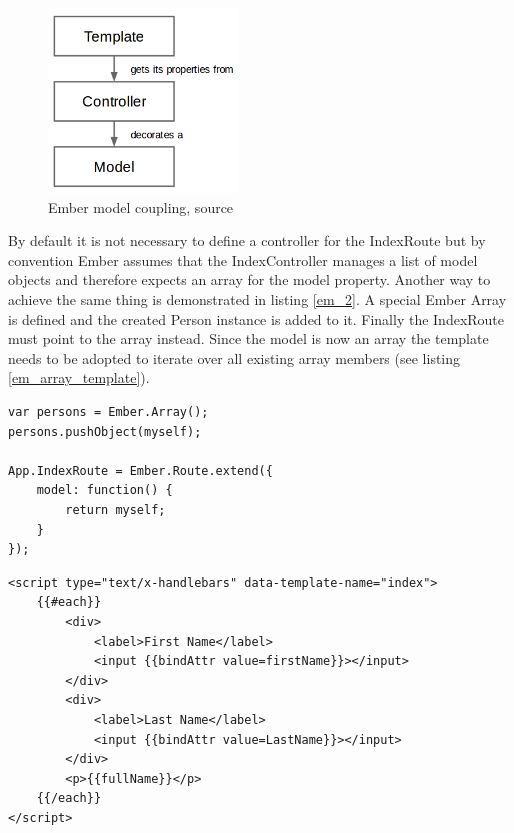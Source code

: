 \begin{figure}
	\centering	\includegraphics[width=0.45\textwidth]{./img/tech-ana/ember_controller_coupling.png}
	\caption{Ember model coupling, source \autocite{tech-ana:em-coupling}}
	\label{fig:ember_coupling}
\end{figure} 
 
By default it is not necessary to define a controller for the IndexRoute but by convention Ember assumes that the IndexController manages a list of model objects and therefore expects an array for the model property.
Another way to achieve the same thing is demonstrated in listing \ref{em_2}.
A special Ember Array is defined and the created Person instance is added to it. Finally the IndexRoute must point to the array instead.
Since the model is now an array the template needs to be adopted to iterate over all existing array members (see listing \ref{em_array_template}).

\begin{lstlisting}[label=em_2,caption=app.js]
var persons = Ember.Array();
persons.pushObject(myself);

App.IndexRoute = Ember.Route.extend({
    model: function() {
        return myself;
    }
});

\end{lstlisting}     

\begin{lstlisting}[label=em_array_template,caption=index.html]
<script type="text/x-handlebars" data-template-name="index">
	{{#each}}
		<div>
			<label>First Name</label> 
			<input {{bindAttr value=firstName}}></input>
		</div>
		<div>
			<label>Last Name</label> 
			<input {{bindAttr value=LastName}}></input>
		</div>
		<p>{{fullName}}</p>
	{{/each}}
</script>
\end{lstlisting}

